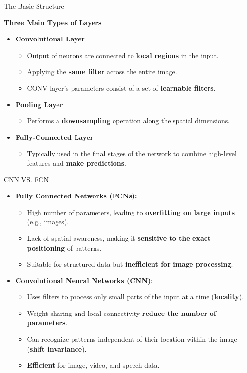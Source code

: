 \documentclass[default, aspectratio=169]{beamer}
\begin{document}
	\begin{frame}{The Basic Structure}
		\item \textbf{Three Main Types of Layers}
		\begin{itemize}
			\item \textbf{Convolutional Layer}
			\begin{itemize}
				\item Output of neurons are connected to \textbf{local regions} in the input.
				\item Applying the \textbf{same filter} across the entire image.
				\item CONV layer’s parameters consist of a set of \textbf{learnable filters}.
			\end{itemize}
			\item \textbf{Pooling Layer}
			\begin{itemize}
				\item Performs a \textbf{downsampling} operation along the spatial dimensions.
			\end{itemize}
			\item \textbf{Fully-Connected Layer}
			\begin{itemize}
				\item Typically used in the final stages of the network to combine high-level features and \textbf{make predictions}.
			\end{itemize}
		\end{itemize}
	\end{frame}
	\begin{frame}{CNN VS. FCN}
		\begin{itemize}
			\item \textbf{Fully Connected Networks (FCNs):}
			\begin{itemize}
				\item High number of parameters, leading to \textbf{overfitting on large inputs} (e.g., images).
				\item Lack of spatial awareness, making it \textbf{sensitive to the exact positioning} of patterns.
				\item Suitable for structured data but \textbf{inefficient for image processing}.
				
			\end{itemize}
			
			\item \textbf{Convolutional Neural Networks (CNN):}
			\begin{itemize}
				\item Uses filters to process only small parts of the input at a time (\textbf{locality}).
				\item Weight sharing and local connectivity \textbf{reduce the number of parameters}.
				\item Can recognize patterns independent of their location within the image (\textbf{shift invariance}).
				\item \textbf{Efficient} for image, video, and speech data.
			\end{itemize}
			
		\end{itemize}
	\end{frame}
	
\end{document}
